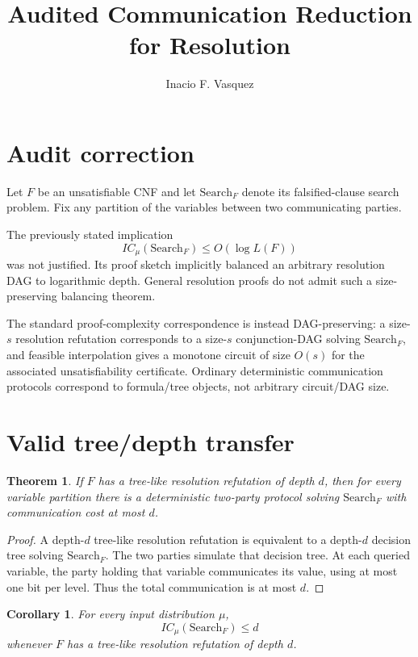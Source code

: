 \documentclass[11pt]{article}
\title{Audited Communication Reduction for Resolution}
\author{Inacio F. Vasquez}
\date{}
\newtheorem{theorem}{Theorem}
\newtheorem{corollary}{Corollary}
\begin{document}
\maketitle

\section*{Audit correction}

Let $F$ be an unsatisfiable CNF and let $\mathrm{Search}_F$ denote its
falsified-clause search problem.  Fix any partition of the variables between
two communicating parties.

The previously stated implication
\[
IC_\mu(\mathrm{Search}_F)\le O(\log L(F))
\]
was not justified.  Its proof sketch implicitly balanced an arbitrary
resolution DAG to logarithmic depth.  General resolution proofs do not admit
such a size-preserving balancing theorem.

The standard proof-complexity correspondence is instead DAG-preserving:
a size-$s$ resolution refutation corresponds to a size-$s$ conjunction-DAG
solving $\mathrm{Search}_F$, and feasible interpolation gives a monotone
circuit of size $O(s)$ for the associated unsatisfiability certificate.
Ordinary deterministic communication protocols correspond to formula/tree
objects, not arbitrary circuit/DAG size.

\section*{Valid tree/depth transfer}

\begin{theorem}
If $F$ has a tree-like resolution refutation of depth $d$, then for every
variable partition there is a deterministic two-party protocol solving
$\mathrm{Search}_F$ with communication cost at most $d$.
\end{theorem}

\begin{proof}
A depth-$d$ tree-like resolution refutation is equivalent to a depth-$d$
decision tree solving $\mathrm{Search}_F$.  The two parties simulate that
decision tree.  At each queried variable, the party holding that variable
communicates its value, using at most one bit per level.  Thus the total
communication is at most $d$.
\end{proof}

\begin{corollary}
For every input distribution $\mu$,
\[
IC_\mu(\mathrm{Search}_F)\le d
\]
whenever $F$ has a tree-like resolution refutation of depth $d$.
\end{corollary}
\end{document}
